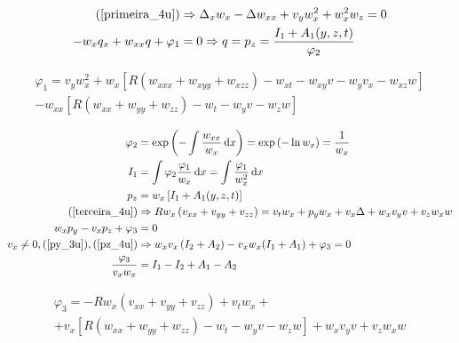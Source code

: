 \documentclass[12pt,a4paper]{article}
\begin{document}
	\begin{align}
    (\ref{primeira_4u}) &\Rightarrow \Delta_x w_x - \Delta w_{xx} + v_y w_x^2 + w_x^2 w_z = 0 \\
    -w_x q_x + w_{xx} q + \varphi_1 &= 0 \Rightarrow q = p_z = \frac{I_1 + A_1(y,z,t)}{\varphi_2}
	\end{align}

	\begin{multline}
    \varphi_1 = v_y w_x^2 + w_x [ R \left(w_{xxx} + w_{xyy} + w_{xzz} \right) - w_{xt} - w_{xy} v - w_y v_x - w_{xz} w] \\
    - w_{xx} [ R \left(w_{xx} + w_{yy} + w_{zz} \right) - w_t - w_y v - w_z w ] \label{fi1_4u}
	\end{multline}

	\begin{align}
	  \varphi_2 &= \exp \left(- \int{ \frac{w_{xx}}{w_x} \,\mathrm{d} x} \right) = \exp \left(- \ln w_x \right) = \frac{1}{w_x} \\
	  I_1 &= \int{ \varphi_2 \frac{\varphi_1 }{w_x} \,\mathrm{d} x} = \int{ \frac{\varphi_1}{w_x^2} \,\mathrm{d} x} \\
	  p_z &= w_x \left[ I_1 + A_1(y,z,t) \right] \label{pz_4u} \\
    (\ref{terceira_4u}) &\Rightarrow R w_x \left(v_{xx} + v_{yy} + v_{zz} \right) = v_t w_x + p_y w_x + v_x \Delta + w_x v_y v + v_z w_x w \\
    w_x p_y - v_x p_z + \varphi_3 &= 0 \\
    v_x \neq 0, (\ref{py_3u}), (\ref{pz_4u}) &\Rightarrow w_x v_x \left(I_2 + A_2 \right) - v_x w_x (I_1 + A_1) + \varphi_3 = 0 \\
    \frac{\varphi_3}{v_x w_x} &= I_1 - I_2 + A_1 - A_2
	\end{align}

	\begin{multline}
	  \varphi_3 = - R w_x \left(v_{xx} + v_{yy} + v_{zz} \right) + v_t w_x + \\
	  + v_x \left[ R \left(w_{xx} + w_{yy} + w_{zz} \right) - w_t - w_y v - w_z w \right] + w_x v_y v + v_z w_x w
	\end{multline}
\end{document}
